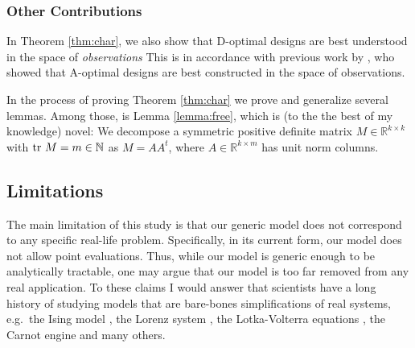 \subsubsection{Other Contributions}
In Theorem \ref{thm:char}, we also show that D-optimal designs are
best understood in the space of \emph{observations}
This is in accordance with previous work by \cite{koval2020}, who
showed that A-optimal designs are best constructed in the space of
observations.

In the process of proving Theorem \ref{thm:char} we prove and
generalize several lemmas. Among those, is Lemma \ref{lemma:free},
which is (to the the best of my knowledge) novel: We decompose a
symmetric positive definite matrix \(M \in \mathbb{R}^{k \times k}\)
with \(\textup{tr}\ M = m \in \mathbb{N}\) as \(M = AA^t\), where \(A\in
\mathbb{R}^{k \times m}\) has unit norm columns.


\subsection{Limitations}\label{subsec:limitations}
The main limitation of this study is that our generic model does not
correspond to any specific real-life problem. Specifically, in its
current form, our model does not allow point evaluations. Thus, while
our model is generic enough to be analytically tractable, one may
argue that our model is too far removed from any real application. To
these claims I would answer that scientists have a long history of
studying models that are bare-bones simplifications of real systems,
e.g.~the Ising model \cite{cipra1987}, the Lorenz system \cite{brin},
the Lotka-Volterra equations \cite{logan2006}, the Carnot engine
\cite{kardar2007} and many others.




































